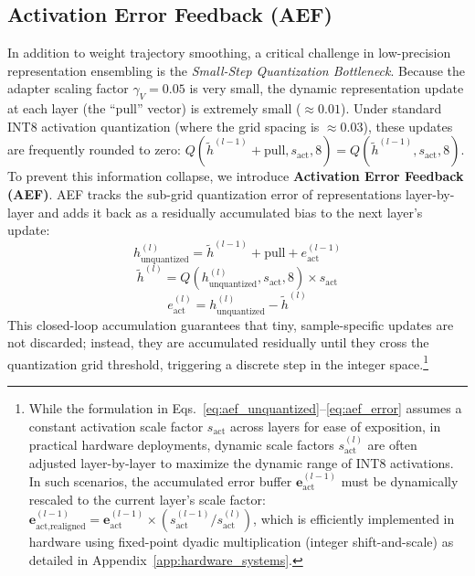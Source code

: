 \subsection{Activation Error Feedback (AEF)}
In addition to weight trajectory smoothing, a critical challenge in low-precision representation ensembling is the \emph{Small-Step Quantization Bottleneck}. Because the adapter scaling factor $\gamma_V = 0.05$ is very small, the dynamic representation update at each layer (the ``pull'' vector) is extremely small ($\approx 0.01$). Under standard INT8 activation quantization (where the grid spacing is $\approx 0.03$), these updates are frequently rounded to zero: $Q(\tilde{h}^{(l-1)} + \text{pull}, s_{\text{act}}, 8) = Q(\tilde{h}^{(l-1)}, s_{\text{act}}, 8)$.
To prevent this information collapse, we introduce \textbf{Activation Error Feedback (AEF)}. AEF tracks the sub-grid quantization error of representations layer-by-layer and adds it back as a residually accumulated bias to the next layer's update:
\begin{equation}\label{eq:aef_unquantized}
    h^{(l)}_{\text{unquantized}} = \tilde{h}^{(l-1)} + \text{pull} + e^{(l-1)}_{\text{act}}
\end{equation}
\begin{equation}\label{eq:aef_quantized}
    \tilde{h}^{(l)} = Q(h^{(l)}_{\text{unquantized}}, s_{\text{act}}, 8) \times s_{\text{act}}
\end{equation}
\begin{equation}\label{eq:aef_error}
    e^{(l)}_{\text{act}} = h^{(l)}_{\text{unquantized}} - \tilde{h}^{(l)}
\end{equation}
This closed-loop accumulation guarantees that tiny, sample-specific updates are not discarded; instead, they are accumulated residually until they cross the quantization grid threshold, triggering a discrete step in the integer space.\footnote{While the formulation in Eqs.~\ref{eq:aef_unquantized}--\ref{eq:aef_error} assumes a constant activation scale factor $s_{\text{act}}$ across layers for ease of exposition, in practical hardware deployments, dynamic scale factors $s_{\text{act}}^{(l)}$ are often adjusted layer-by-layer to maximize the dynamic range of INT8 activations. In such scenarios, the accumulated error buffer $\mathbf{e}_{\text{act}}^{(l-1)}$ must be dynamically rescaled to the current layer's scale factor: $\mathbf{e}_{\text{act}, \text{realigned}}^{(l-1)} = \mathbf{e}_{\text{act}}^{(l-1)} \times \left( s_{\text{act}}^{(l-1)} / s_{\text{act}}^{(l)} \right)$, which is efficiently implemented in hardware using fixed-point dyadic multiplication (integer shift-and-scale) as detailed in Appendix~\ref{app:hardware_systems}.} 


